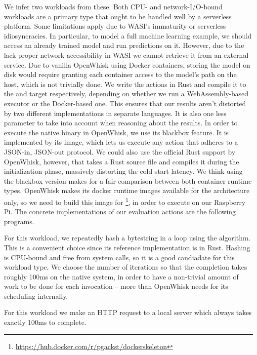 We infer two workloads from these. Both CPU- and network-I/O-bound workloads are a primary type that ought to be handled well by a serverless platform. Some limitations apply due to WASI's immaturity or serverless idiosyncracies. In particular, to model a full machine learning example, we should access an already trained model and run predictions on it. However, due to the lack proper network accessibility in WASI we cannot retrieve it from an external service. Due to vanilla OpenWhisk using Docker containers, storing the model on disk would require granting each container access to the model's path on the host, which is not trivially done. We write the actions in Rust and compile it to the  and  target respectively, depending on whether we run a WebAssembly-based executor or the Docker-based one. This ensures that our results aren't distorted by two different implementations in separate languages. It is also one less parameter to take into account when reasoning about the results. In order to execute the native binary in OpenWhisk, we use its blackbox feature. It is implemented by its  image, which lets us execute any action that adheres to a JSON-in, JSON-out protocol. We could also use the official Rust support by OpenWhisk, however, that takes a Rust source file and compiles it during the initialization phase, massively distorting the cold start latency. We think using the blackbox version makes for a fair comparison between both container runtime types.
OpenWhisk makes its docker runtime images available for the  architecture only, so we need to build this image for \footnote{\url{https://hub.docker.com/r/pgackst/dockerskeleton}}, in order to execute on our Raspberry Pi. The concrete implementations of our evaluation actions are the following programs.

\begin{description}[style=multiline, leftmargin=2.5cm, font=\bfseries]
    \item[CPU-bound] For this workload, we repeatedly hash a bytestring in a loop using the   algorithm. This is a convenient choice since its reference implementation is in Rust. Hashing is CPU-bound and free from system calls, so it is a good candiadate for this workload type. We choose the number of iterations so that the completion takes roughly 100ms on the native system, in order to have a non-trivial amount of work to be done for each invocation -- more than OpenWhisk needs for its scheduling internally.
    \item[Network-I/O-bound] For this workload we make an HTTP request to a local server which always takes exactly 100ms to complete.
\end{description}

